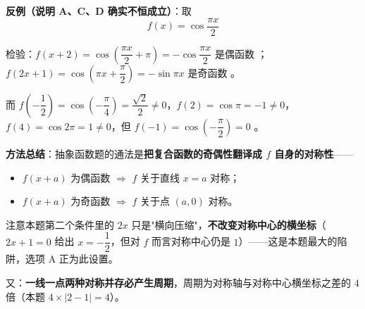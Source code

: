 \begin{answer}
\textbf{反例（说明 A、C、D 确实不恒成立）}：取
\nopagebreak[4]
\[f(x)=\cos\frac{\pi x}2\]

检验：$f(x+2)=\cos\left(\dfrac{\pi x}2+\pi\right)=-\cos\dfrac{\pi x}2$ 是偶函数 ；$f(2x+1)=\cos\left(\pi x+\dfrac\pi2\right)=-\sin\pi x$ 是奇函数 。

而 $f\left(-\dfrac12\right)=\cos\left(-\dfrac\pi4\right)=\dfrac{\sqrt2}2\ne0$，$f(2)=\cos\pi=-1\ne0$，$f(4)=\cos2\pi=1\ne0$，但 $f(-1)=\cos\left(-\dfrac\pi2\right)=0$ 。

\begin{gktip}
\textbf{方法总结}：抽象函数题的通法是\textbf{把复合函数的奇偶性翻译成 $f$ 自身的对称性}——
\begin{itemize}
\item $f(x+a)$ 为偶函数 $\Longrightarrow$ $f$ 关于直线 $x=a$ 对称；
\item $f(x+a)$ 为奇函数 $\Longrightarrow$ $f$ 关于点 $(a,0)$ 对称。
\end{itemize}

注意本题第二个条件里的 $2x$ 只是"横向压缩"，\textbf{不改变对称中心的横坐标}（$2x+1=0$ 给出 $x=-\dfrac12$，但对 $f$ 而言对称中心仍是 $1$）——这是本题最大的陷阱，选项 A 正为此设置。

又：\textbf{一线一点两种对称并存必产生周期}，周期为对称轴与对称中心横坐标之差的 $4$ 倍（本题 $4\times|2-1|=4$）。
\end{gktip}


\par\medskip

\end{answer}

